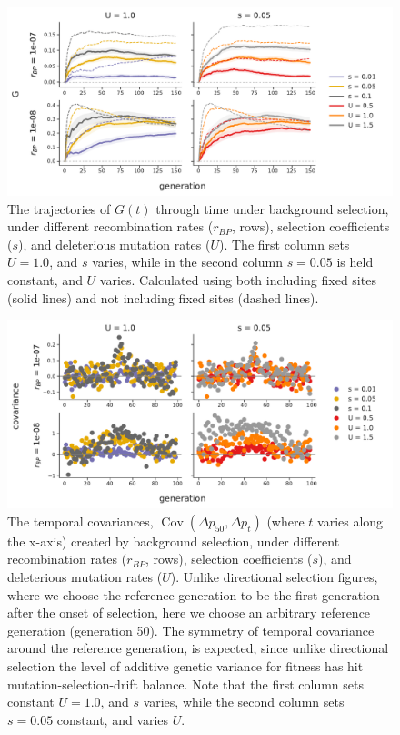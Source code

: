 \documentclass[11pt]{article}
\DeclareMathOperator{\cov}{Cov}
\begin{document}
\begin{figure}[!ht]
  \centering
  \includegraphics[width=\textwidth]{figures/fig-bgs-G-with-fixations.pdf}

  \caption{The trajectories of $G(t)$ through time under background selection,
    under different recombination rates ($r_{BP}$, rows), selection
    coefficients ($s$), and deleterious mutation rates ($U$). The first column
    sets $U = 1.0$, and $s$ varies, while in the second column $s=0.05$ is held
  constant, and $U$ varies. Calculated using both including fixed sites (solid
lines) and not including fixed sites (dashed lines).}

  \label{suppfig:supp-bgs-g-fix}
\end{figure}

\begin{figure}[!ht]
  \centering
  \includegraphics[width=\textwidth]{figures/fig-bgs-covars-without-fixations.pdf}

  \caption{The temporal covariances, $\cov(\Delta p_{50}, \Delta p_t)$ (where
    $t$ varies along the x-axis) created by background selection, under
    different recombination rates ($r_{BP}$, rows), selection coefficients
    ($s$), and deleterious mutation rates ($U$). Unlike directional selection
    figures, where we choose the reference generation to be the first
    generation after the onset of selection, here we choose an arbitrary
    reference generation (generation 50). The symmetry of temporal covariance
    around the reference generation, is expected, since unlike directional
    selection the level of additive genetic variance for fitness has hit
    mutation-selection-drift balance. Note that the first column sets constant
  $U = 1.0$, and $s$ varies, while the second column sets $s=0.05$ constant,
and varies $U$.}

  \label{suppfig:supp-bgs-covs}
\end{figure}
\end{document}
